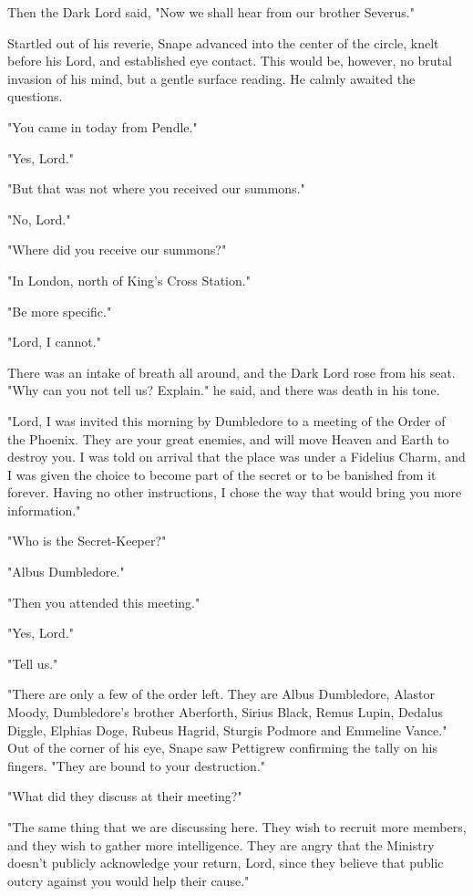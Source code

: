 Then the Dark Lord said, "Now we shall hear from our brother Severus."

Startled out of his reverie, Snape advanced into the center of the circle, knelt before his Lord, and established eye contact. This would be, however, no brutal invasion of his mind, but a gentle surface reading. He calmly awaited the questions.

"You came in today from Pendle."

"Yes, Lord."

"But that was not where you received our summons."

"No, Lord."

"Where did you receive our summons?"

"In London, north of King's Cross Station."

"Be more specific."

"Lord, I cannot."

There was an intake of breath all around, and the Dark Lord rose from his seat. "Why can you not tell us? Explain." he said, and there was death in his tone.

"Lord, I was invited this morning by Dumbledore to a meeting of the Order of the Phoenix. They are your great enemies, and will move Heaven and Earth to destroy you. I was told on arrival that the place was under a Fidelius Charm, and I was given the choice to become part of the secret or to be banished from it forever. Having no other instructions, I chose the way that would bring you more information."

"Who is the Secret-Keeper?"

"Albus Dumbledore."

"Then you attended this meeting."

"Yes, Lord."

"Tell us."

"There are only a few of the order left. They are Albus Dumbledore, Alastor Moody, Dumbledore's brother Aberforth, Sirius Black, Remus Lupin, Dedalus Diggle, Elphias Doge, Rubeus Hagrid, Sturgis Podmore and Emmeline Vance." Out of the corner of his eye, Snape saw Pettigrew confirming the tally on his fingers. "They are bound to your destruction."

"What did they discuss at their meeting?"

"The same thing that we are discussing here. They wish to recruit more members, and they wish to gather more intelligence. They are angry that the Ministry doesn't publicly acknowledge your return, Lord, since they believe that public outcry against you would help their cause."

